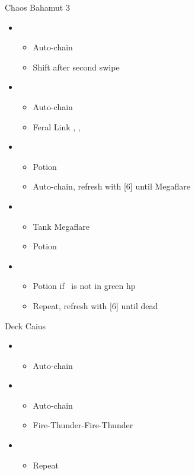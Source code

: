 \begin{battle}{Chaos Bahamut 3}
	\begin{flushleft}
		\begin{itemize}
			\item \sixth
			      \begin{itemize}
				      \item Auto-chain
				      \item Shift after second swipe
			      \end{itemize}
			\item \second
			      \begin{itemize}
				      \item Auto-chain
				      \item Feral Link \circlec, \squarec, \circlec
			      \end{itemize}
			\item \sixth
			      \begin{itemize}
				      \item Potion
				      \item Auto-chain, refresh with [6] until Megaflare
			      \end{itemize}
			\item \fourth
			      \begin{itemize}
				      \item Tank Megaflare
				      \item Potion
			      \end{itemize}
			\item \fifth
			      \begin{itemize}
				      \item Potion if \chu\ is not in green hp
				      \item Repeat, refresh with [6] until dead
			      \end{itemize}
		\end{itemize}
	\end{flushleft}
\end{battle}

\begin{battle}{Deck Caius}
	\begin{flushleft}
		\begin{itemize}
			\item \sixth
			      \begin{itemize}
				      \item Auto-chain
			      \end{itemize}
			\item \fifth
			      \begin{itemize}
				      \item Auto-chain
				      \item Fire-Thunder-Fire-Thunder
			      \end{itemize}
			\item \sixth
			      \begin{itemize}
				      \item Repeat
			      \end{itemize}
		\end{itemize}
	\end{flushleft}
\end{battle}

